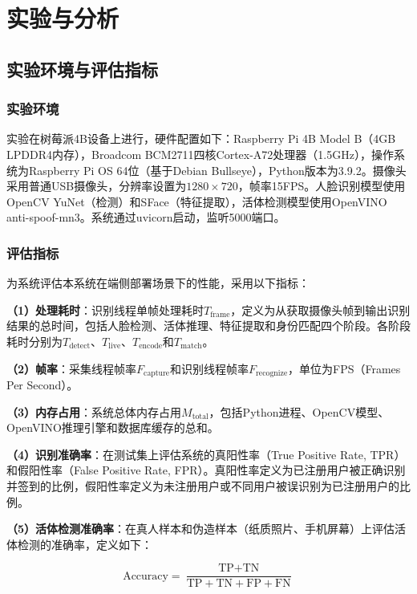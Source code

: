 \chapter{实验与分析}

\section{实验环境与评估指标}

\subsection{实验环境}

实验在树莓派4B设备上进行，硬件配置如下：Raspberry Pi 4B Model B（4GB LPDDR4内存），Broadcom BCM2711四核Cortex-A72处理器（1.5GHz），操作系统为Raspberry Pi OS 64位（基于Debian Bullseye），Python版本为3.9.2。摄像头采用普通USB摄像头，分辨率设置为$1280 \times 720$，帧率15FPS。人脸识别模型使用OpenCV YuNet（检测）和SFace（特征提取），活体检测模型使用OpenVINO anti-spoof-mn3。系统通过uvicorn启动，监听5000端口。

\subsection{评估指标}

为系统评估本系统在端侧部署场景下的性能，采用以下指标：

\textbf{（1）处理耗时}：识别线程单帧处理耗时$T_{\text{frame}}$，定义为从获取摄像头帧到输出识别结果的总时间，包括人脸检测、活体推理、特征提取和身份匹配四个阶段。各阶段耗时分别为$T_{\text{detect}}$、$T_{\text{live}}$、$T_{\text{encode}}$和$T_{\text{match}}$。

\textbf{（2）帧率}：采集线程帧率$F_{\text{capture}}$和识别线程帧率$F_{\text{recognize}}$，单位为FPS（Frames Per Second）。

\textbf{（3）内存占用}：系统总体内存占用$M_{\text{total}}$，包括Python进程、OpenCV模型、OpenVINO推理引擎和数据库缓存的总和。

\textbf{（4）识别准确率}：在测试集上评估系统的真阳性率（True Positive Rate, TPR）和假阳性率（False Positive Rate, FPR）。真阳性率定义为已注册用户被正确识别并签到的比例，假阳性率定义为未注册用户或不同用户被误识别为已注册用户的比例。

\textbf{（5）活体检测准确率}：在真人样本和伪造样本（纸质照片、手机屏幕）上评估活体检测的准确率，定义如下：

\begin{equation}
    \text{Accuracy} = \frac{\text{TP} + \text{TN}}{\text{TP} + \text{TN} + \text{FP} + \text{FN}}
\end{equation}

